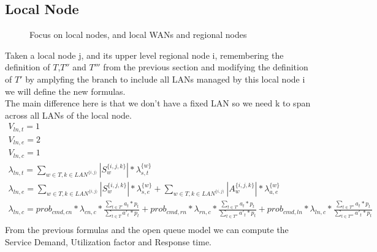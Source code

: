 \documentclass[11pt]{article}
\begin{document}
\subsection{Local Node}
\begin{figure}[H]
	\centering
	\hspace*{-3.7cm}
	\frame{}
	\caption{Focus on local nodes, and local WANs and regional nodes}
\end{figure}
Taken a local node j, and its upper level regional node i, remembering the definition of $T$,$T''$ and $T'''$ from the previous section and modifying the definition of $T'$ by amplyfing the branch to include all LANs managed by this local node i we will define the new formulas.\\
The main difference here is that we don't have a fixed LAN so we need k to span across all LANs of the local node.
\begin{equation}
    \begin{array}{l}
        V_{ln, t} = 1 \\
        V_{ln, e} = 2 \\ %
        V_{ln,c} = 1 \\
        \lambda_{ln, t} = \sum\limits_{w \in T,k \in LAN^{\{i,j)}}{| S^{\{i,j,k\}}_{w} | * \lambda^{\{w\}}_{s, t}}  \\
        \lambda_{ln, e} = \sum\limits_{w \in T,k \in LAN^{\{i,j)}}{| S^{\{i,j,k\}}_{w} | * \lambda^{\{w\}}_{s, e}} + \sum\limits_{w \in T,k \in LAN^{\{i,j)}}{| A^{\{i,j,k\}}_{w} | * \lambda^{\{w\}}_{a, e}}\\
		\lambda_{ln, c} = prob_{cmd,cn} * \lambda_{cn, c} * \frac{\sum\limits_{t \in T'}{a_{t} * p_{t}}}{\sum\limits_{t \in T}{a'_{t} * p_{t}}} + prob_{cmd,rn} * \lambda_{rn, c} *\frac{\sum\limits_{t \in T'}{a_{t} * p_{t}}}{\sum\limits_{t \in T''}{a'_{t} * p_{t}}}  + prob_{cmd,ln} * \lambda_{ln, c} * \frac{\sum\limits_{t \in T''}{a_{t} * p_{t}}}{\sum\limits_{t \in T'''}{a'_{t} * p_{t}}}  \\\

    \end{array}
\end{equation}
From the previous formulas and the open queue model we can compute the Service Demand, Utilization factor and Response time.
\end{document}
